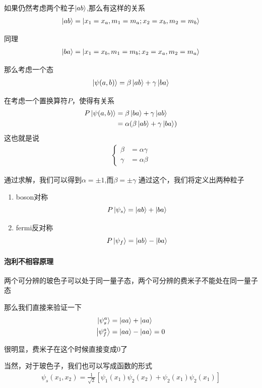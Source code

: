 \documentclass{article}
\begin{document}
如果仍然考虑两个粒子$\ket{ab}$,那么有这样的关系
\begin{align*}
	\ket{ab}=\ket{x_1=x_a,m_1=m_a;x_2=x_b,m_2=m_b}
\end{align*}

同理
\begin{align*}
	\ket{ba}=\ket{x_1=x_b,m_1=m_b;x_2=x_a,m_2=m_a}
\end{align*}

那么考虑一个态
\begin{align*}
	\ket{\psi(a,b)}=\beta\ket{ab}+\gamma\ket{ba}
\end{align*}

在考虑一个置换算符$P$，使得有关系
\begin{align*}
	P\ket{\psi(a,b)} & =\beta\ket{ba}+\gamma\ket{ab}         \\
	                 & =\alpha(\beta\ket{ab}+\gamma\ket{ba})
\end{align*}
这也就是说
\begin{align*}
	\begin{cases}
		\beta  & =\alpha\gamma \\
		\gamma & =\alpha\beta
	\end{cases}
\end{align*}

通过求解，我们可以得到$\alpha=\pm 1$,而$\beta =\pm \gamma$
通过这个，我们将定义出两种粒子

\begin{enumerate}
	\item[(1)] boson对称\[P\ket{\psi_s}=\ket{ab}+\ket{ba}\]
	\item[(2)] fermi反对称\[P\ket{\psi_f}=\ket{ab}-\ket{ba}\]
\end{enumerate}

\paragraph{泡利不相容原理}
两个可分辨的玻色子可以处于同一量子态，两个可分辨的费米子不能处在同一量子态

那么我们直接来验证一下
\begin{align*}
	\ket{\psi_s^a} & =\ket{aa}+\ket{aa}   \\
	\ket{\psi_f^a} & =\ket{aa}-\ket{aa}=0
\end{align*}

很明显，费米子在这个时候直接变成$0$了

当然，对于玻色子，我们也可以写成函数的形式
\begin{align*}
	\psi_{s}(x_1,x_2)=\frac{1}{\sqrt{2}}\left[\psi_1(x_1)\psi_2(x_2)+\psi_2(x_1)\psi_2(x_1)\right]
\end{align*}
\end{document}
